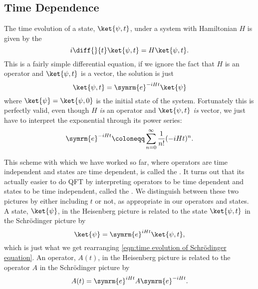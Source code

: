 \documentclass[fleqn]{NotesClass}
\newcommand{\e}{\symrm{e}}
\begin{document}
    \subsection{Time Dependence}
    The time evolution of a state, \(\ket{\psi, t}\), under a system with Hamiltonian \(H\) is given by the 
    \begin{equation}
        i \diff{}{t} \ket{\psi, t} = H\ket{\psi, t}.
    \end{equation}
    This is a fairly simple differential equation, if we ignore the fact that \(H\) is an operator and \(\ket{\psi, t}\) is a vector, the solution is just
    \begin{equation}\label{eqn:time evolution of Schrödinger equation}
        \ket{\psi, t} = \e^{-iHt}\ket{\psi}
    \end{equation}
    where \(\ket{\psi} = \ket{\psi, 0}\) is the initial state of the system.
    Fortunately this is perfectly valid, even though \(H\) \emph{is} an operator and \(\ket{\psi, t}\) \emph{is} vector, we just have to interpret the exponential through its power series:
    \begin{equation}
        \e^{-iHt} \coloneqq \sum_{n = 0}^{\infty} \frac{1}{n!}(-iHt)^n.
    \end{equation}
    
    This scheme with which we have worked so far, where operators are time independent and states are time dependent, is called the .
    It turns out that its actually easier to do QFT by interpreting operators to be time dependent and states to be time independent, called the .
    We distinguish between these two pictures by either including \(t\) or not, as appropriate in our operators and states.
    A state, \(\ket{\psi}\), in the Heisenberg picture is related to the state \(\ket{\psi, t}\) in the Schrödinger picture by
    \begin{equation}
        \ket{\psi} = \e^{iHt}\ket{\psi, t},
    \end{equation}
    which is just what we get rearranging \cref{eqn:time evolution of Schrödinger equation}.
    An operator, \(A(t)\), in the Heisenberg picture is related to the operator \(A\) in the Schrödinger picture by
    \begin{equation}
        A(t) = \e^{iHt} A \e^{-iHt}.
    \end{equation}
    
\end{document}
